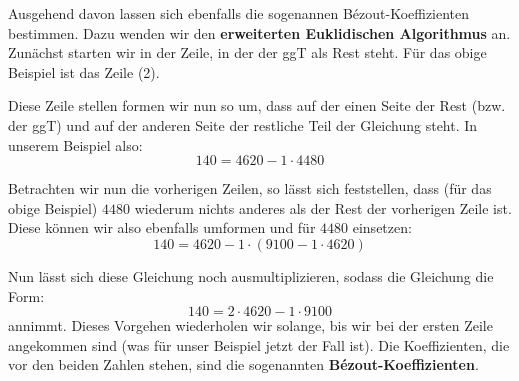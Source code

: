 \documentclass[11pt]{article}
\begin{document}
Ausgehend davon lassen sich ebenfalls die sogenannen Bézout-Koeffizienten bestimmen. Dazu wenden wir den
\textbf{erweiterten Euklidischen Algorithmus} an. Zunächst starten wir in der Zeile, in der der ggT als Rest steht. Für
das obige Beispiel ist das Zeile (2).

Diese Zeile stellen formen wir nun so um, dass auf der einen Seite der Rest (bzw. der ggT) und auf der anderen Seite der
restliche Teil der Gleichung steht. In unserem Beispiel also:
\[
  140 = 4620 - 1 \cdot 4480
\]

Betrachten wir nun die vorherigen Zeilen, so lässt sich feststellen, dass (für das obige Beispiel) $4480$ wiederum nichts
anderes als der Rest der vorherigen Zeile ist. Diese können wir also ebenfalls umformen und für $4480$ einsetzen:
\[
  140 = 4620 - 1 \cdot (9100 - 1 \cdot 4620)
\]

Nun lässt sich diese Gleichung noch ausmultiplizieren, sodass die Gleichung die Form:
\[
  140 = 2 \cdot 4620 - 1 \cdot 9100
\]
annimmt. Dieses Vorgehen wiederholen wir solange, bis wir bei der ersten Zeile angekommen sind (was für unser Beispiel
jetzt der Fall ist). Die Koeffizienten, die vor den beiden Zahlen stehen, sind die sogenannten
\textbf{Bézout-Koeffizienten}.
\end{document}
